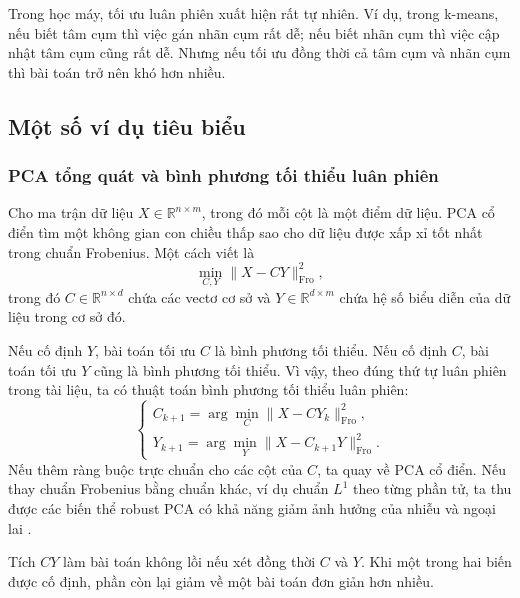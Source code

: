Trong học máy, tối ưu luân phiên xuất hiện rất tự nhiên. Ví dụ, trong k-means, nếu biết tâm cụm thì việc gán nhãn cụm rất dễ; nếu biết nhãn cụm thì việc cập nhật tâm cụm cũng rất dễ. Nhưng nếu tối ưu đồng thời cả tâm cụm và nhãn cụm thì bài toán trở nên khó hơn nhiều.

\subsection{Một số ví dụ tiêu biểu}
\label{SUB_SEC_examples_alternation}

\subsubsection*{PCA tổng quát và bình phương tối thiểu luân phiên}
Cho ma trận dữ liệu $X\in\mathbb{R}^{n\times m}$, trong đó mỗi cột là một điểm dữ liệu. PCA cổ điển tìm một không gian con chiều thấp sao cho dữ liệu được xấp xỉ tốt nhất trong chuẩn Frobenius. Một cách viết là
\begin{equation}
    \min_{C,Y}\|X-CY\|_{\mathrm{Fro}}^2,
    \label{eq_pca_als}
\end{equation}
trong đó $C\in\mathbb{R}^{n\times d}$ chứa các vectơ cơ sở và $Y\in\mathbb{R}^{d\times m}$ chứa hệ số biểu diễn của dữ liệu trong cơ sở đó.
\medskip

Nếu cố định $Y$, bài toán tối ưu $C$ là bình phương tối thiểu. Nếu cố định $C$, bài toán tối ưu $Y$ cũng là bình phương tối thiểu. Vì vậy, theo đúng thứ tự luân phiên trong tài liệu, ta có thuật toán bình phương tối thiểu luân phiên:
\begin{equation}
    \begin{cases}
        C_{k+1}=\arg\min_C \|X-CY_k\|_{\mathrm{Fro}}^2,\\
        Y_{k+1}=\arg\min_Y \|X-C_{k+1}Y\|_{\mathrm{Fro}}^2.
    \end{cases}
    \label{eq_pca_als_steps}
\end{equation}
Nếu thêm ràng buộc trực chuẩn cho các cột của $C$, ta quay về PCA cổ điển. Nếu thay chuẩn Frobenius bằng chuẩn khác, ví dụ chuẩn $L^1$ theo từng phần tử, ta thu được các biến thể robust PCA có khả năng giảm ảnh hưởng của nhiễu và ngoại lai \cite{Candes2011RPCA}.
\medskip

Tích $CY$ làm bài toán không lồi nếu xét đồng thời $C$ và $Y$. Khi một trong hai biến được cố định, phần còn lại giảm về một bài toán đơn giản hơn nhiều.

